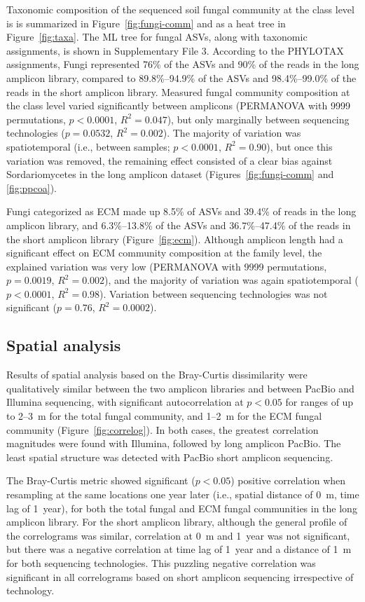 \documentclass[
  12pt,
]{article}
\begin{document}
Taxonomic composition of the sequenced soil fungal community at the class level is is summarized in Figure~\ref{fig:fungi-comm} and as a heat tree \autocite{foster2017} in Figure~\ref{fig:taxa}.
The ML tree for fungal ASVs, along with taxonomic assignments, is shown in Supplementary File 3.
According to the PHYLOTAX assignments, Fungi represented 76\% of the ASVs and 90\% of the reads in the long amplicon library, compared to 89.8\%--94.9\% of the ASVs and 98.4\%--99.0\% of the reads in the short amplicon library.
Measured fungal community composition at the class level varied significantly between amplicons (PERMANOVA with 9999 permutations, \(p<0.0001\), \(R^2=0.047\)), but only marginally between sequencing technologies (\(p=0.0532\), \(R^2=0.002\)).
The majority of variation was spatiotemporal (i.e., between samples; \(p<0.0001\), \(R^2=0.90\)), but once this variation was removed, the remaining effect consisted of a clear bias against Sordariomycetes in the long amplicon dataset (Figures~\ref{fig:fungi-comm} and \ref{fig:ppcoa}).

Fungi categorized as ECM made up 8.5\% of ASVs and 39.4\% of reads in the long amplicon library, and 6.3\%--13.8\% of the ASVs and 36.7\%--47.4\% of the reads in the short amplicon library (Figure~\ref{fig:ecm}).
Although amplicon length had a significant effect on ECM community composition at the family level, the explained variation was very low (PERMANOVA with 9999 permutations, \(p=0.0019\), \(R^2=0.002\)), and the majority of variation was again spatiotemporal (\(p<0.0001\), \(R^2=0.98\)).
Variation between sequencing technologies was not significant (\(p=0.76\), \(R^2=0.0002\)).

\hypertarget{spatial-analysis}{%
\subsection{Spatial analysis}\label{spatial-analysis}}

Results of spatial analysis based on the Bray-Curtis dissimilarity were qualitatively similar between the two amplicon libraries and between PacBio and Illumina sequencing, with significant autocorrelation at \(p < 0.05\) for ranges of up to 2--3~m for the total fungal community, and 1--2~m for the ECM fungal community (Figure~\ref{fig:correlog}).
In both cases, the greatest correlation magnitudes were found with Illumina, followed by long amplicon PacBio.
The least spatial structure was detected with PacBio short amplicon sequencing.

The Bray-Curtis metric showed significant (\(p < 0.05\)) positive correlation when resampling at the same locations one year later (i.e., spatial distance of 0~m, time lag of 1~year), for both the total fungal and ECM fungal communities in the long amplicon library.
For the short amplicon library, although the general profile of the correlograms was similar, correlation at 0~m and 1~year was not significant, but there was a negative correlation at time lag of 1~year and a distance of 1~m for both sequencing technologies.
This puzzling negative correlation was significant in all correlograms based on short amplicon sequencing irrespective of technology.
\end{document}
